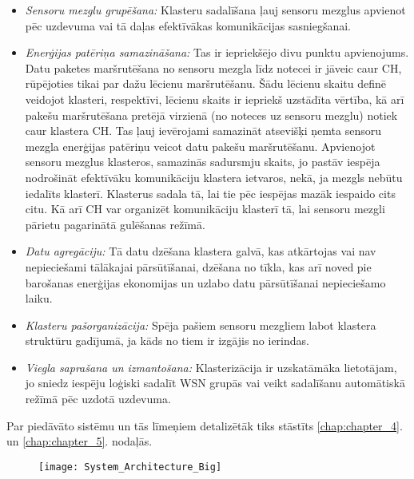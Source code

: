\begin{itemize}
\item {\it Sensoru mezglu grupēšana:} Klasteru sadalīšana ļauj sensoru mezglus apvienot pēc uzdevuma vai tā daļas efektīvākas komunikācijas sasniegšanai.
\item {\it Enerģijas patēriņa samazināšana:} Tas ir iepriekšējo divu punktu apvienojums. Datu paketes maršrutēšana no sensoru mezgla līdz notecei ir jāveic caur CH, rūpējoties tikai par dažu lēcienu maršrutēšanu. Šādu lēcienu skaitu definē veidojot klasteri, respektīvi, lēcienu skaits ir iepriekš uzstādīta vērtība, kā arī pakešu maršrutēšana pretējā virzienā (no noteces uz sensoru mezglu) notiek caur klastera CH. Tas ļauj ievērojami samazināt atsevišķi ņemta sensoru mezgla enerģijas patēriņu veicot datu pakešu maršrutēšanu. Apvienojot sensoru mezglus klasteros, samazinās sadursmju skaits, jo pastāv iespēja nodrošināt efektīvāku komunikāciju klastera ietvaros, nekā, ja mezgls nebūtu iedalīts klasterī. Klasterus sadala tā, lai tie pēc iespējas mazāk iespaido cits citu. Kā arī CH var organizēt komunikāciju klasterī tā, lai sensoru mezgli pārietu pagarinātā gulēšanas režīmā.
\item {\it Datu agregāciju:} Tā datu dzēšana klastera galvā, kas atkārtojas vai nav nepieciešami tālākajai pārsūtīšanai, dzēšana no tīkla, kas arī noved pie barošanas enerģijas ekonomijas un uzlabo datu pārsūtīšanai nepieciešamo laiku.
\item {\it Klasteru pašorganizācija:} Spēja pašiem sensoru mezgliem labot klastera struktūru gadījumā, ja kāds no tiem ir izgājis no ierindas.
\item {\it Viegla saprašana un izmantošana:} Klasterizācija ir uzskatāmāka lietotājam, jo sniedz iespēju loģiski sadalīt WSN grupās vai veikt sadalīšanu automātiskā režīmā pēc uzdotā uzdevuma.
\end{itemize} 

Par piedāvāto sistēmu un tās līmeņiem detalizētāk tiks stāstīts \ref{chap:chapter_4}. un \ref{chap:chapter_5}. nodaļās.


\begin{figure}[h]
\begin{center}
\texttt{[image: System\_Architecture\_Big]}
\end{center}
\caption{\textbf{\fontsize{11}{12}\selectfont {Divu līmeņu klasterizēta WSN arhitektūra}}}
\label{fig:System_Architecture}
\end{figure}

